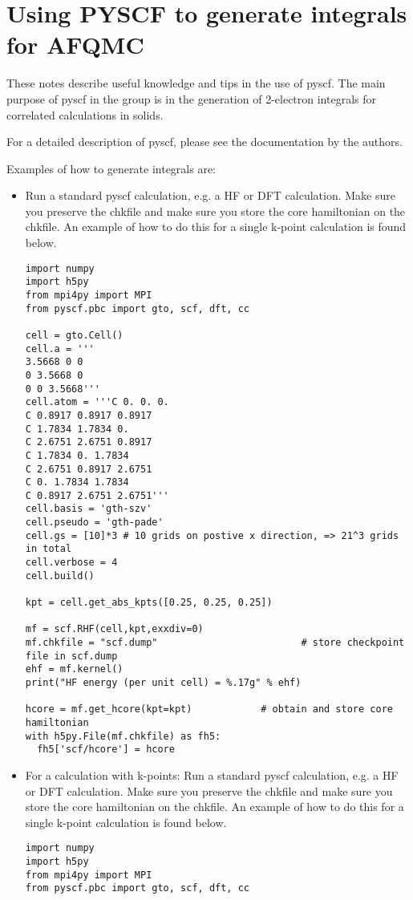\section{Using PYSCF to generate integrals for AFQMC}
\label{sec:pyscf}
These notes describe useful knowledge and tips in the use of pyscf. 
The main purpose of pyscf in the group is in the generation of 2-electron integrals for correlated calculations in solids.

For a detailed description of pyscf, please see the documentation by the authors.

Examples of how to generate integrals are:
\begin{itemize}
\item Run a standard pyscf calculation, e.g. a HF or DFT calculation. Make sure you preserve the chkfile and make sure you store the core hamiltonian on the chkfile. An example of how to do this for a single k-point calculation is found below.
\begin{lstlisting}[caption=The following is an example PYSCF input file for single k-point calculations.]
import numpy
import h5py
from mpi4py import MPI
from pyscf.pbc import gto, scf, dft, cc

cell = gto.Cell()
cell.a = '''
3.5668 0 0
0 3.5668 0
0 0 3.5668'''
cell.atom = '''C 0. 0. 0. 
C 0.8917 0.8917 0.8917
C 1.7834 1.7834 0. 
C 2.6751 2.6751 0.8917
C 1.7834 0. 1.7834
C 2.6751 0.8917 2.6751
C 0. 1.7834 1.7834
C 0.8917 2.6751 2.6751'''
cell.basis = 'gth-szv'
cell.pseudo = 'gth-pade'
cell.gs = [10]*3 # 10 grids on postive x direction, => 21^3 grids in total
cell.verbose = 4
cell.build()

kpt = cell.get_abs_kpts([0.25, 0.25, 0.25])  

mf = scf.RHF(cell,kpt,exxdiv=0)
mf.chkfile = "scf.dump"                         # store checkpoint file in scf.dump
ehf = mf.kernel()
print("HF energy (per unit cell) = %.17g" % ehf)

hcore = mf.get_hcore(kpt=kpt)            # obtain and store core hamiltonian
with h5py.File(mf.chkfile) as fh5:
  fh5['scf/hcore'] = hcore
\end{lstlisting}

\item {For a calculation with k-points:
Run a standard pyscf calculation, e.g. a HF or DFT calculation. Make sure you preserve the chkfile and make sure you store the core hamiltonian on the chkfile. An example of how to do this for a single k-point calculation is found below.}

\begin{lstlisting}[caption=The following is an example PYSCF input file for calculations with k-points.]
import numpy
import h5py
from mpi4py import MPI
from pyscf.pbc import gto, scf, dft, cc


\end{lstlisting}
\end{itemize}
